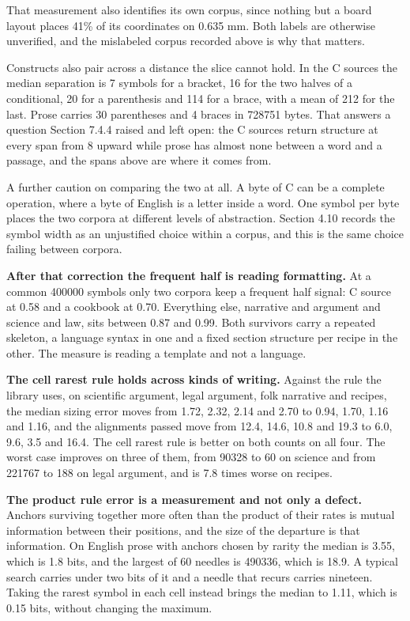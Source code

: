 That measurement also identifies its own corpus, since nothing but a board layout places 41\% of its coordinates on 0.635 mm. Both labels are otherwise unverified, and the mislabeled corpus recorded above is why that matters.

Constructs also pair across a distance the slice cannot hold. In the C sources the median separation is 7 symbols for a bracket, 16 for the two halves of a conditional, 20 for a parenthesis and 114 for a brace, with a mean of 212 for the last. Prose carries 30 parentheses and 4 braces in 728751 bytes. That answers a question Section 7.4.4 raised and left open: the C sources return structure at every span from 8 upward while prose has almost none between a word and a passage, and the spans above are where it comes from.

A further caution on comparing the two at all. A byte of C can be a complete operation, where a byte of English is a letter inside a word. One symbol per byte places the two corpora at different levels of abstraction. Section 4.10 records the symbol width as an unjustified choice within a corpus, and this is the same choice failing between corpora.

\textbf{After that correction the frequent half is reading formatting.} At a common 400000 symbols only two corpora keep a frequent half signal: C source at 0.58 and a cookbook at 0.70. Everything else, narrative and argument and science and law, sits between 0.87 and 0.99. Both survivors carry a repeated skeleton, a language syntax in one and a fixed section structure per recipe in the other. The measure is reading a template and not a language.

\textbf{The cell rarest rule holds across kinds of writing.} Against the rule the library uses, on scientific argument, legal argument, folk narrative and recipes, the median sizing error moves from 1.72, 2.32, 2.14 and 2.70 to 0.94, 1.70, 1.16 and 1.16, and the alignments passed move from 12.4, 14.6, 10.8 and 19.3 to 6.0, 9.6, 3.5 and 16.4. The cell rarest rule is better on both counts on all four. The worst case improves on three of them, from 90328 to 60 on science and from 221767 to 188 on legal argument, and is 7.8 times worse on recipes.

\textbf{The product rule error is a measurement and not only a defect.} Anchors surviving together more often than the product of their rates is mutual information between their positions, and the size of the departure is that information. On English prose with anchors chosen by rarity the median is 3.55, which is 1.8 bits, and the largest of 60 needles is 490336, which is 18.9. A typical search carries under two bits of it and a needle that recurs carries nineteen. Taking the rarest symbol in each cell instead brings the median to 1.11, which is 0.15 bits, without changing the maximum.


